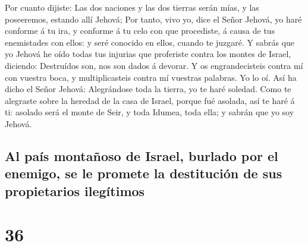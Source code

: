  Por cuanto dijiste: Las dos naciones y las dos tierras
serán mías, y las poseeremos, estando allí Jehová;  Por
tanto, vivo yo, dice el Señor Jehová, yo haré conforme á tu ira, y
conforme á tu celo con que procediste, á causa de tus enemistades con
ellos: y seré conocido en ellos, cuando te juzgaré.  Y
sabrás que yo Jehová he oído todas tus injurias que proferiste contra
los montes de Israel, diciendo: Destruídos son, nos son dados á devorar.
 Y os engrandecisteis contra mí con vuestra boca, y
multiplicasteis contra mí vuestras palabras. Yo lo oí. 
Así ha dicho el Señor Jehová: Alegrándose toda la tierra, yo te haré
soledad.  Como te alegraste sobre la heredad de la casa
de Israel, porque fué asolada, así te haré á ti: asolado será el monte
de Seir, y toda Idumea, toda ella; y sabrán que yo soy Jehová.

\hypertarget{al-pauxeds-montauxf1oso-de-israel-burlado-por-el-enemigo-se-le-promete-la-destituciuxf3n-de-sus-propietarios-ileguxedtimos}{%
\subsection{Al país montañoso de Israel, burlado por el enemigo, se le
promete la destitución de sus propietarios
ilegítimos}\label{al-pauxeds-montauxf1oso-de-israel-burlado-por-el-enemigo-se-le-promete-la-destituciuxf3n-de-sus-propietarios-ileguxedtimos}}

\hypertarget{section-35}{%
\section{36}\label{section-35}}

